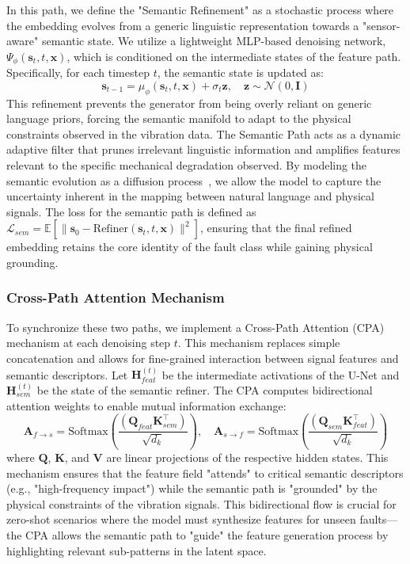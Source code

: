 In this path, we define the "Semantic Refinement" as a stochastic process where the embedding evolves from a generic linguistic representation towards a "sensor-aware" semantic state. We utilize a lightweight MLP-based denoising network, $\Psi_\phi(\mathbf{s}_t, t, \mathbf{x})$, which is conditioned on the intermediate states of the feature path. Specifically, for each timestep $t$, the semantic state is updated as:
\begin{equation}
\mathbf{s}_{t-1} = \mu_\phi(\mathbf{s}_t, t, \mathbf{x}) + \sigma_t \mathbf{z}, \quad \mathbf{z} \sim \mathcal{N}(0, \mathbf{I})
\end{equation}
This refinement prevents the generator from being overly reliant on generic language priors, forcing the semantic manifold to adapt to the physical constraints observed in the vibration data. The Semantic Path acts as a dynamic adaptive filter that prunes irrelevant linguistic information and amplifies features relevant to the specific mechanical degradation observed. By modeling the semantic evolution as a diffusion process~\cite{song2020score,wang2025visual}, we allow the model to capture the uncertainty inherent in the mapping between natural language and physical signals. The loss for the semantic path is defined as $\mathcal{L}_{sem} = \mathbb{E} [\| \mathbf{s}_0 - \text{Refiner}(\mathbf{s}_t, t, \mathbf{x}) \|^2]$, ensuring that the final refined embedding retains the core identity of the fault class while gaining physical grounding.

\subsubsection{Cross-Path Attention Mechanism}
To synchronize these two paths, we implement a Cross-Path Attention (CPA) mechanism at each denoising step $t$. This mechanism replaces simple concatenation and allows for fine-grained interaction between signal features and semantic descriptors. Let $\mathbf{H}_{feat}^{(t)}$ be the intermediate activations of the U-Net and $\mathbf{H}_{sem}^{(t)}$ be the state of the semantic refiner. The CPA computes bidirectional attention weights to enable mutual information exchange:
\begin{equation}
\mathbf{A}_{f \to s} = \text{Softmax}\left(\frac{(\mathbf{Q}_{feat} \mathbf{K}_{sem}^\top)}{\sqrt{d_k}}\right), \quad \mathbf{A}_{s \to f} = \text{Softmax}\left(\frac{(\mathbf{Q}_{sem} \mathbf{K}_{feat}^\top)}{\sqrt{d_k}}\right)
\end{equation}
where $\mathbf{Q}$, $\mathbf{K}$, and $\mathbf{V}$ are linear projections of the respective hidden states. This mechanism ensures that the feature field "attends" to critical semantic descriptors (e.g., "high-frequency impact") while the semantic path is "grounded" by the physical constraints of the vibration signals. This bidirectional flow is crucial for zero-shot scenarios where the model must synthesize features for unseen faults—the CPA allows the semantic path to "guide" the feature generation process by highlighting relevant sub-patterns in the latent space.


